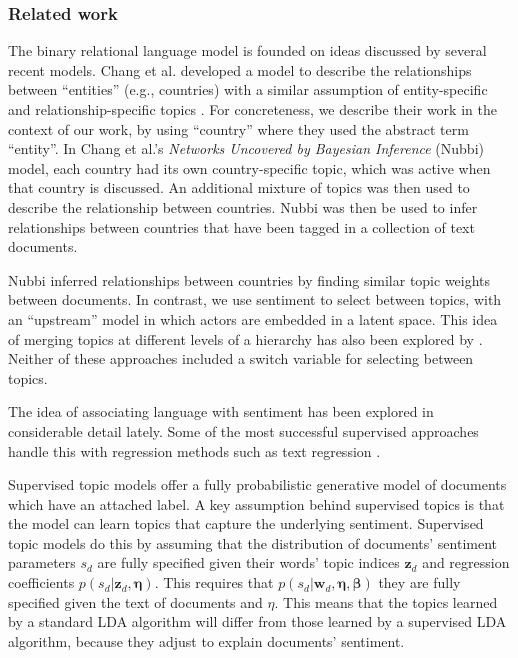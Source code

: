 \subsubsection{Related work}
The binary relational language model is founded on ideas discussed by
several recent models.  Chang et al. developed a model to describe the
relationships between ``entities'' (e.g., countries) with a similar
assumption of entity-specific and relationship-specific topics
\citep{chang:2009nubbi}.  For concreteness, we describe their work in
the context of our work, by using ``country'' where they used the
abstract term ``entity''.  In Chang et al.'s \emph{Networks Uncovered
  by Bayesian Inference} (Nubbi) model, each country had its own
country-specific topic, which was active when that country is
discussed.  An additional mixture of topics was then used to describe
the relationship between countries.  Nubbi was then be used to infer
relationships between countries that have been tagged in a collection
of text documents.

Nubbi inferred relationships between countries by finding similar
topic weights between documents. In contrast, we use sentiment to
select between topics, with an ``upstream'' model in which actors are
embedded in a latent space. This idea of merging topics at different
levels of a hierarchy has also been explored by
\cite{chemudugunta:2009}.  Neither of these approaches included a
switch variable for selecting between topics.

The idea of associating language with sentiment has been explored in
considerable detail lately.  Some of the most successful supervised
approaches handle this with regression methods such as text regression
\citep{kogan:2009}.

Supervised topic models \citep{blei:2008} offer a fully probabilistic
generative model of documents which have an attached label.  A key
assumption behind supervised topics is that the model can learn topics
that capture the underlying sentiment.  Supervised topic models do
this by assuming that the distribution of documents' sentiment
parameters $s_d$ are fully specified given their words' topic indices
$\bm z_d$ and regression coefficients $p(s_d | \bm z_d, \bm \eta)$.
This requires that $p(s_d | \bm w_d, \bm \eta, \bm \beta)$ they are
fully specified given the text of documents and $\eta$. This means
that the topics learned by a standard LDA algorithm will differ from
those learned by a supervised LDA algorithm, because they adjust to
explain documents' sentiment.

